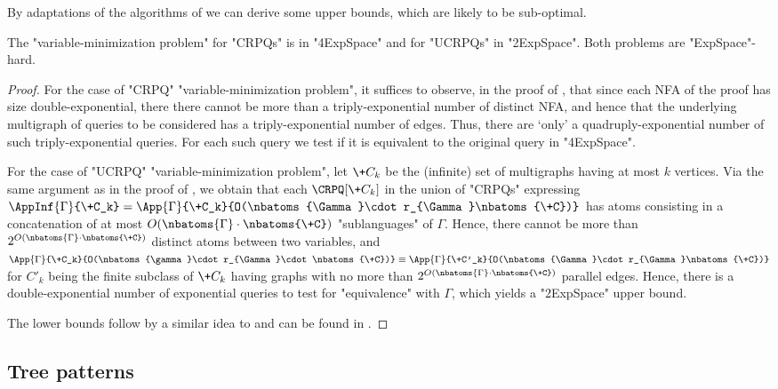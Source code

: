 By adaptations of the algorithms of  we can derive some upper bounds, which are likely to be sub-optimal.
\begin{theorem}
  The "variable-minimization problem" for "CRPQs" is in "4ExpSpace" and for "UCRPQs" in "2ExpSpace". Both problems are "ExpSpace"-hard.
\end{theorem}

\begin{proof}
  For the case of "CRPQ" "variable-minimization problem", it suffices to observe, in the proof of , that since each NFA of the proof has size double-exponential, there there cannot be more than a triply-exponential number of distinct NFA, and hence that the underlying multigraph of queries to be considered has a triply-exponential number of edges. Thus, there are `only' a quadruply-exponential number of such triply-exponential queries. For each such query we test if it is equivalent to the original query in "4ExpSpace".

  For the case of "UCRPQ" "variable-minimization problem", let $\+C_k$ be the (infinite) set of multigraphs having at most $k$ vertices. Via the same argument as in the proof of , 
  we obtain that each $\CRPQ[\+C_k]$ in the union of "CRPQs" expressing
  $\AppInf{\Gamma}{\+C_k}=\App{\Gamma}{\+C_k}{O(\nbatoms{\Gamma}\cdot r_{\Gamma}\nbatoms{\+C})}$
  has atoms consisting in a concatenation of
  at most $O(\nbatoms{\Gamma}\cdot\nbatoms{\+C})$ "sublanguages" of $\Gamma$. Hence, there cannot be more than $2^{O(\nbatoms{\Gamma}\cdot\nbatoms{\+C})}$ distinct atoms between two variables, and $\App{\Gamma}{\+C_k}{O(\nbatoms{\gamma}\cdot r_{\Gamma}\cdot \nbatoms{\+C})} \equiv \App{\Gamma}{\+C'_k}{O(\nbatoms{\Gamma}\cdot r_{\Gamma}\nbatoms{\+C})}$ for $C'_k$ being the finite subclass of $\+C_k$ having graphs with no more than $2^{O(\nbatoms{\Gamma}\cdot\nbatoms{\+C})}$ parallel edges.
  Hence, there is a double-exponential number of exponential queries to test for "equivalence" with $\Gamma$, which yields a "2ExpSpace" upper bound.


  The lower bounds follow by a similar idea to  and can be found in .
\end{proof}


\subsection{Tree patterns}
\AP\label{sec:apdx-tree-patterns}

